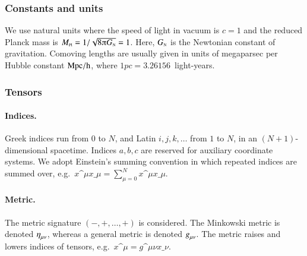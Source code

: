 
\newcommand\Chr{\ChristoffelSym}




\subsubsection{Constants and units}
We use natural units where the speed of light in vacuum is $c=1$ and the reduced Planck mass is $M\nped{Pl}=1/\sqrt{8\ppi G\nped{N}}=1$. Here, $G_{\text{\tiny{N}}}$ is the Newtonian constant of gravitation. Comoving lengths are usually given in units of megaparsec per Hubble constant $\mathrm{Mpc/h}$, where $1\unit{pc}=3.26156$~light-years.
%

\subsubsection{Tensors}

\paragraph{Indices.} %
Greek indices run from $0$ to $N$, and Latin $i,j,k, \dots$ from $1$ to $N$, in an $(N+1)$-dimensional spacetime. Indices $a,b,c$ are reserved for auxiliary coordinate systems. We adopt Einstein's summing convention in which repeated indices are 
summed over, e.g.~$x\^\mu x\_\mu= \sum_{\mu=0}^N x\^{\mu} x\_{\mu}$.

\paragraph{Metric.} %
The metric signature $(-,+,\dots,+)$ is considered. %
The Minkowski metric is denoted $\eta\indices{_{\mu\nu}}$, whereas a general metric is denoted $g\indices{_{\mu\nu}}$. 
The metric raises and lowers indices of tensors, e.g.~$x\^\mu = g\^{\mu\nu}x\_\nu$.

